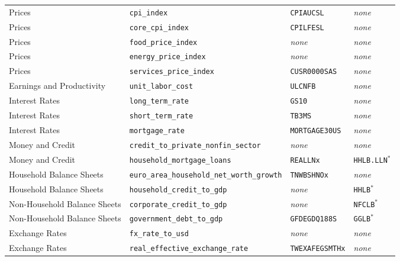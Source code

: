 \documentclass[11pt]{article}
\begin{document}
\begin{longtable}{L{4cm} L{4cm} L{2.8cm} L{2.5cm}}
Prices & \texttt{cpi\_\allowbreak{}index} & \texttt{CPIAUCSL} & \emph{none} \\
Prices & \texttt{core\_\allowbreak{}cpi\_\allowbreak{}index} & \texttt{CPILFESL} & \emph{none} \\
Prices & \texttt{food\_\allowbreak{}price\_\allowbreak{}index} & \emph{none} & \emph{none} \\
Prices & \texttt{energy\_\allowbreak{}price\_\allowbreak{}index} & \emph{none} & \emph{none} \\
Prices & \texttt{services\_\allowbreak{}price\_\allowbreak{}index} & \texttt{CUSR0000SAS} & \emph{none} \\
Earnings and Productivity & \texttt{unit\_\allowbreak{}labor\_\allowbreak{}cost} & \texttt{ULCNFB} & \emph{none} \\
Interest Rates & \texttt{long\_\allowbreak{}term\_\allowbreak{}rate} & \texttt{GS10} & \emph{none} \\
Interest Rates & \texttt{short\_\allowbreak{}term\_\allowbreak{}rate} & \texttt{TB3MS} & \emph{none} \\
Interest Rates & \texttt{mortgage\_\allowbreak{}rate} & \texttt{MORTGAGE30US} & \emph{none} \\
Money and Credit & \texttt{credit\_\allowbreak{}to\_\allowbreak{}private\_\allowbreak{}nonfin\_\allowbreak{}sector} & \emph{none} & \emph{none} \\
Money and Credit & \texttt{household\_\allowbreak{}mortgage\_\allowbreak{}loans} & \texttt{REALLNx} & \texttt{HHLB.\allowbreak{}LLN}$^{*}$ \\
Household Balance Sheets & \texttt{euro\_\allowbreak{}area\_\allowbreak{}household\_\allowbreak{}net\_\allowbreak{}worth\_\allowbreak{}growth} & \texttt{TNWBSHNOx} & \emph{none} \\
Household Balance Sheets & \texttt{household\_\allowbreak{}credit\_\allowbreak{}to\_\allowbreak{}gdp} & \emph{none} & \texttt{HHLB}$^{*}$ \\
Non-Household Balance Sheets & \texttt{corporate\_\allowbreak{}credit\_\allowbreak{}to\_\allowbreak{}gdp} & \emph{none} & \texttt{NFCLB}$^{*}$ \\
Non-Household Balance Sheets & \texttt{government\_\allowbreak{}debt\_\allowbreak{}to\_\allowbreak{}gdp} & \texttt{GFDEGDQ188S} & \texttt{GGLB}$^{*}$ \\
Exchange Rates & \texttt{fx\_\allowbreak{}rate\_\allowbreak{}to\_\allowbreak{}usd} & \emph{none} & \emph{none} \\
Exchange Rates & \texttt{real\_\allowbreak{}effective\_\allowbreak{}exchange\_\allowbreak{}rate} & \texttt{TWEXAFEGSMTHx} & \emph{none} \\

\end{longtable}
\end{document}
